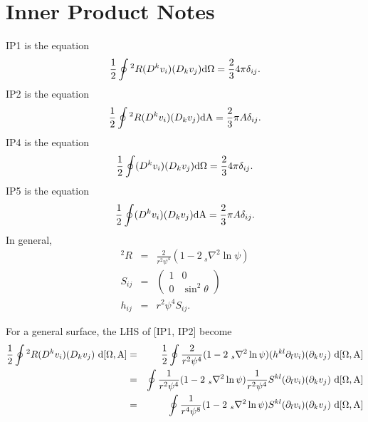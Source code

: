 \documentclass[11pt]{article}
\begin{document}
\section{Inner Product Notes}
IP1 is the equation
\begin{equation}
\frac{1}{2} \oint {^2}R (D^k v_i)(D_k v_j) {\rm d \Omega} = \frac{2}{3} 4 \pi \delta_{ij}.
\end{equation}
IP2 is the equation
\begin{equation}
\frac{1}{2} \oint {^2}R (D^k v_i)(D_k v_j) {\rm d A} = \frac{2}{3}  \pi A \delta_{ij}.
\end{equation}
IP4 is the equation
\begin{equation}
\frac{1}{2} \oint  (D^k v_i)(D_k v_j) {\rm d \Omega} = \frac{2}{3} 4 \pi \delta_{ij}.
\end{equation}
IP5 is the equation
\begin{equation}
\frac{1}{2} \oint  (D^k v_i)(D_k v_j) {\rm d A} = \frac{2}{3}  \pi A \delta_{ij}.
\end{equation}
In general,
\begin{eqnarray}
{^2}R &=& \frac{2}{r^2 \psi^4} (1-2{~_s}\nabla^2 \ln \psi)\\
S_{ij} &=& \left( \begin{matrix} 1&0 \\ 0 & \sin^2 \theta \end{matrix} \right) \\
h_{ij} &=& r^2 \psi^4 S_{ij}.
\end{eqnarray}

\noindent
For a general surface, the LHS of [IP1, IP2] become
\begin{eqnarray}
\frac{1}{2} \oint {^2}R (D^k v_i)(D_k v_j) {~\rm d [\Omega, A]}
&=& \frac{1}{2} \oint \frac{2}{r^2 \psi^4}(1-2{~_s}\nabla^2 \ln \psi) (h^{kl} \partial_l v_i) (\partial_k v_j) {~\rm d [\Omega,A]} \\
&=& \oint \frac{1}{r^2 \psi^4}(1-2{~_s}\nabla^2 \ln \psi) \frac{1}{r^2 \psi^4} S^{kl} (\partial_l v_{i})(\partial_k v_{j}) {~\rm d [\Omega,A]} \\
&=& \oint \frac{1}{r^4 \psi^8}(1-2{~_s}\nabla^2 \ln \psi) S^{kl} (\partial_l v_{i})(\partial_k v_{j}) {~\rm d [\Omega,A]}
\end{eqnarray}
\end{document}
